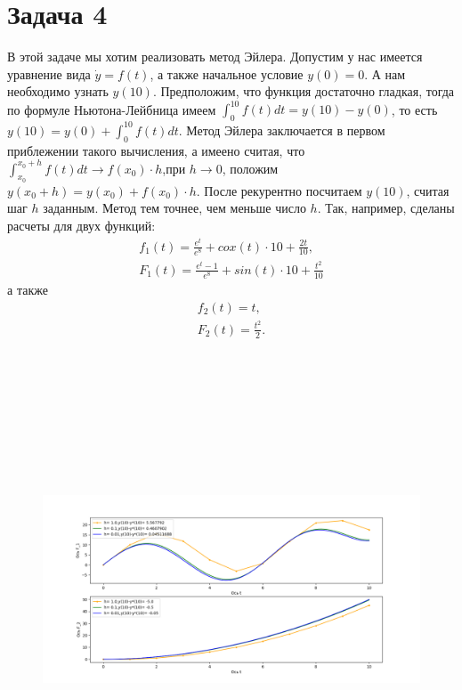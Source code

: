 \documentclass[a4paper,12pt]{article}
\begin{document}
  \section*{Задача 4}
  В этой задаче мы хотим реализовать метод Эйлера.
  Допустим у нас имеется уравнение вида $\dot y=f(t)$, а также начальное условие $y(0)=0$. А нам необходимо узнать $y(10)$.
  Предположим, что функция достаточно гладкая, тогда по формуле Ньютона-Лейбница имеем $\int_{0}^{10}f(t)dt=y(10)-y(0)$, то есть $y(10)=y(0)+\int_{0}^{10}f(t)dt$.
  Метод Эйлера заключается в первом приблежении такого вычисления, а имеено считая, что $\int_{x_0}^{x_0+h}f(t)dt\rightarrow f(x_0)\cdot h$,при $h\rightarrow0$, положим  $y(x_0+h)=y(x_0)+f(x_0)\cdot h$. После рекурентно посчитаем $y(10)$, считая шаг $h$ заданным. Метод тем точнее, чем меньше число $h$.
  Так, например, сделаны расчеты для двух функций: 
  \begin{align*}
    f_1(t)=\frac{e^t}{e^8}+cox(t)\cdot10+\frac{2t}{10}, \\
    F_1(t)=\frac{e^t-1}{e^8}+sin(t)\cdot10+\frac{t^2}{10}
  \end{align*}
  а также
  \begin{align*}
    f_2(t)=t, \\
    F_2(t)=\frac{t^2}{2}.
  \end{align*}
  \begin{figure}[H]
    \begin{flushleft}
      \includegraphics[width=1.0\textwidth, height=14cm]{DEF_4.png}
    \end{flushleft}
  \end{figure}
  
\end{document}
